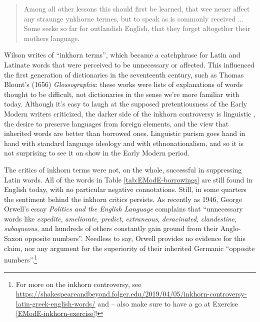 \begin{quote}
    Among all other lessons this should first be learned, that wee neuer affect any straunge ynkhorne termes, but to speak as is commonly received ... Some seeke so far for outlandish English, that they forget altogether their mothers language.
\end{quote}

\noindent Wilson writes of ``inkhorn terms'', which became a catchphrase for Latin and Latinate words that were perceived to be unnecessary or affected. This influenced the first generation of dictionaries in the seventeenth century, such as Thomas Blount's (1656) \textit{Glossographia}: these works were lists of explanations of words thought to be difficult, not dictionaries in the sense we're more familiar with today. Although it's easy to laugh at the supposed pretentiousness of the Early Modern writers criticized, the darker side of the inkhorn controversy is linguistic  \citep{Thomas1991,LangerNesse2012}, the desire to preserve languages from foreign elements, and the view that inherited words are better than borrowed ones. Linguistic purism goes hand in hand with standard language ideology and with ethnonationalism, and so it is not surprising to see it on show in the Early Modern period.

The critics of inkhorn terms were not, on the whole, successful in suppressing Latin words. All of the words in Table \ref{tab:EModE-borrowings} are still found in English today, with no particular negative connotations. Still, in some quarters the sentiment behind the inkhorn critics persists. As recently as 1946, George Orwell's essay \textit{Politics and the English Language} complains that ``unnecessary words like \textit{expedite}, \textit{ameliorate}, \textit{predict}, \textit{extraneous}, \textit{deracinated}, \textit{clandestine}, \textit{subaqueous}, and hundreds of others constantly gain ground from their Anglo-Saxon opposite numbers''. Needless to say, Orwell provides no evidence for this claim, nor any argument for the superiority of their inherited Germanic ``opposite numbers''.\footnote{For more on the inkhorn controversy, see \url{https://shakespeareandbeyond.folger.edu/2019/04/05/inkhorn-controversy-latin-greek-english-words/} and \citet[Chapter 2]{Barber1997} -- also make sure to have a go at Exercise \ref{EModE-inkhorn-exercise}!}

